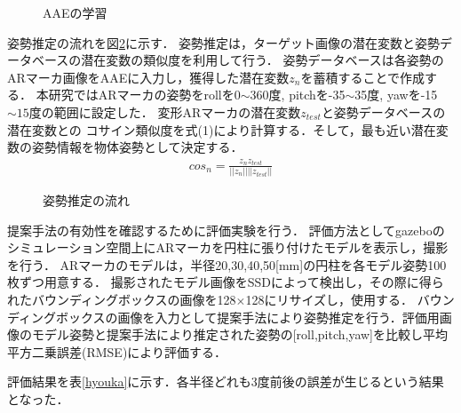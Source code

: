 \documentclass{jsarticle}
\begin{document}
\begin{figure}[ht]
\vspace{0zh}
\setlength{\epsfxsize}{7.5cm}
\centerline{}
\vspace{0zh}
\caption{AAEの学習}
\label{BB}
\vspace{-2zh}
\end{figure}




姿勢推定の流れを図\ref{GG}に示す．
姿勢推定は，ターゲット画像の潜在変数と姿勢データベースの潜在変数の類似度を利用して行う．
姿勢データベースは各姿勢のARマーカ画像をAAEに入力し，獲得した潜在変数$z_n$を蓄積することで作成する．
本研究ではARマーカの姿勢をrollを0$\sim$360度, pitchを-35$\sim$35度, yawを-15$\sim15$度の範囲に設定した．
変形ARマーカの潜在変数$z_{test}$と姿勢データベースの潜在変数との
コサイン類似度を式(1)により計算する．そして，最も近い潜在変数の姿勢情報を物体姿勢として決定する．
\begin{eqnarray}
\label{cos}
cos_n=\frac{z_n z_{test}}{||z_n|| ||z_{test}||}
\end{eqnarray}


\begin{figure}[ht]
\vspace{0zh}
\setlength{\epsfxsize}{7.5cm}
\centerline{}
\vspace{0zh}
\caption{姿勢推定の流れ}
\label{GG}
\vspace{-1.0zh}
\end{figure}





提案手法の有効性を確認するために評価実験を行う．
評価方法としてgazeboのシミュレーション空間上にARマーカを円柱に張り付けたモデルを表示し，撮影を行う．
ARマーカのモデルは，半径20,30,40,50[mm]の円柱を各モデル姿勢100枚ずつ用意する．
撮影されたモデル画像をSSDによって検出し，その際に得られたバウンディングボックスの画像を128$\times$128にリサイズし，使用する．
バウンディングボックスの画像を入力として提案手法により姿勢推定を行う．評価用画像のモデル姿勢と提案手法により推定された姿勢の[roll,pitch,yaw]を比較し平均平方二乗誤差(RMSE)により評価する．

評価結果を表\ref{hyouka}に示す．各半径どれも3度前後の誤差が生じるという結果となった．
\end{document}

